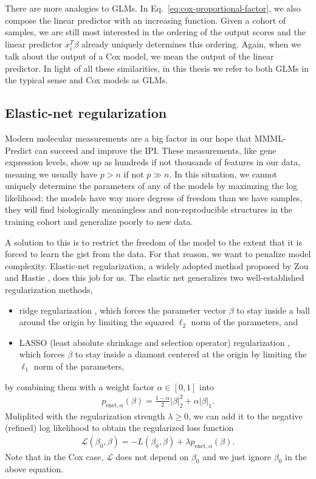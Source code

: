 There are more analogies to GLMs. In Eq.\ \eqref{eq:cox-proportional-factor}, we also compose the 
linear predictor with an increasing function. Given a cohort of samples, we are still most 
interested in the ordering of the output scores and the linear predictor $x_i^T \beta$ already 
uniquely determines this ordering. Again, when we talk about the output of a Cox model, we mean the 
output of the linear predictor. In light of all these similarities,
in this thesis we refer to both GLMs in the typical sense and Cox models as GLMs.

\subsection{Elastic-net regularization} \label{subsec:elastic-net}

Modern molecular measurements are a big factor in our hope that MMML-Predict can succeed and improve 
the IPI. These measurements, like gene expression levels, show up as hundreds if not thousands of 
features in our data, meaning we usually have $p > n$ if not $p \gg n$. In this situation, we 
cannot uniquely determine the parameters of any of the models by maximzing the log likelihood: 
the models have way more degress of freedom than we have samples, they will find biologically 
meaningless and non-reproducible structures in the training cohort and generalize poorly to new 
data.

A solution to this is to restrict the freedom of the model to the extent that it is forced to 
learn the gist from the data. For that reason, we want to penalize model complexity. Elastic-net 
regularization, a widely adopted method proposed by Zou and Hastie \cite{elasticnet05}, does this 
job for us. The elastic net generalizes two well-established regularization methods,
\begin{itemize}
    \item ridge regularization \cite{ridge70}, which forces the parameter vector $\beta$ to 
        stay inside a ball around the origin by limiting the squared $\ell_2$ norm 
        of the parameters, and 
    \item LASSO (least absolute shrinkage and selection operator) regularization \cite{lasso18}, 
        which forces $\beta$ to stay inside a diamont centered at the origin by limiting the 
        $\ell_1$ norm of the parameters,
\end{itemize}
by combining them with a weight factor $\alpha \in [0, 1]$ into 
\begin{align}
    p_{\text{enet}, \alpha}(\beta) = \frac{1-\alpha}{2} |\beta|_2^2 + \alpha |\beta|_1.
\end{align}
Muliplited with the regularization strength $\lambda \geq 0$, we can add it to the negative 
(refined) log likelihood to obtain the regularized loss function
\begin{align}
    \mathcal{L}(\beta_0, \beta) = -L(\beta_0, \beta) + \lambda p_{\text{enet}, \alpha}(\beta).
\end{align}
Note that in the Cox case, $\mathcal{L}$ does not depend on $\beta_0$ and we just ignore $\beta_0$ 
in the above equation. 

